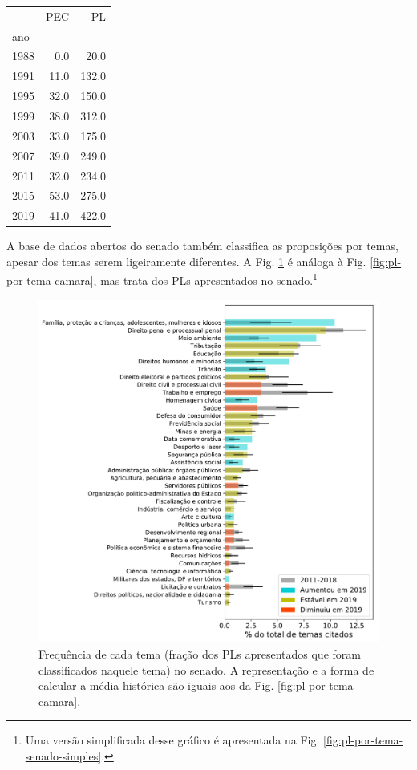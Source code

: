 \documentclass[12pt,a4paper]{article}
\begin{document}
\begin{tabular}{lrr}
\toprule
 &   PEC &     PL \\
ano  &       &        \\
\midrule
1988 &   0.0 &   20.0 \\
1991 &  11.0 &  132.0 \\
1995 &  32.0 &  150.0 \\
1999 &  38.0 &  312.0 \\
2003 &  33.0 &  175.0 \\
2007 &  39.0 &  249.0 \\
2011 &  32.0 &  234.0 \\
2015 &  53.0 &  275.0 \\
2019 &  41.0 &  422.0 \\
\bottomrule
\end{tabular}



A base de dados abertos do senado também classifica as proposições por temas, apesar dos temas serem
ligeiramente diferentes. A Fig. \ref{fig:pl-por-tema-senado} é análoga à Fig. \ref{fig:pl-por-tema-camara}, mas trata dos PLs apresentados
no senado.\footnote{Uma versão simplificada desse gráfico é apresentada na Fig. \ref{fig:pl-por-tema-senado-simples}.}


\begin{figure}[H]
\centering
\includegraphics[width=1.0\textwidth]{graficos/senado/pls-temas-senado-r-completo.pdf}
\caption{Frequência de cada tema (fração dos PLs apresentados que foram classificados
  naquele tema) no senado. A representação e a forma de calcular a média histórica são iguais
  aos da Fig. \ref{fig:pl-por-tema-camara}.}
\label{fig:pl-por-tema-senado}
\end{figure}
\end{document}
